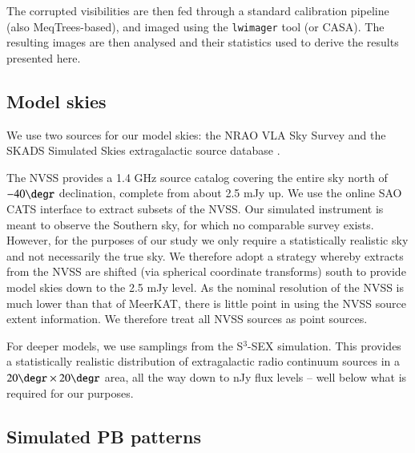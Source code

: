 \documentclass{aa}
\begin{document}
The corrupted visibilities are then fed through a standard calibration pipeline (also MeqTrees-based), and imaged using the {\tt lwimager} tool (or CASA). The resulting images are then analysed and their statistics used to derive the results presented here.


\subsection{Model skies}

We use two sources for our model skies: the NRAO VLA Sky Survey \citep[NVSS:][]{NVSS} and the SKADS Simulated Skies extragalactic source database \citep[S$^3$-SEX:][]{S3-SEX}. 

The NVSS provides a 1.4 GHz source catalog covering the entire sky north of $-40\degr$ declination, complete from about 2.5 mJy up. We use the online SAO CATS interface \citep{SAO-CATS} to extract subsets of the NVSS. Our simulated instrument is meant to observe the Southern sky, for which no comparable survey exists. However, for the purposes of our study we only require a statistically realistic sky and not necessarily the true sky. We therefore adopt a strategy whereby extracts from the NVSS are shifted (via spherical coordinate transforms) south to provide model skies down to the 2.5 mJy level. As the nominal resolution of the NVSS is much lower than that of MeerKAT, there is little point in using the NVSS source extent information. We therefore treat all NVSS sources as point sources. 

For deeper models, we use samplings from the S$^3$-SEX simulation. This provides a statistically realistic distribution of extragalactic radio continuum sources in a $20\degr\times20\degr$ area, all the way down to nJy flux levels -- well below what is required for our purposes.

\subsection{Simulated PB patterns}
\end{document}
